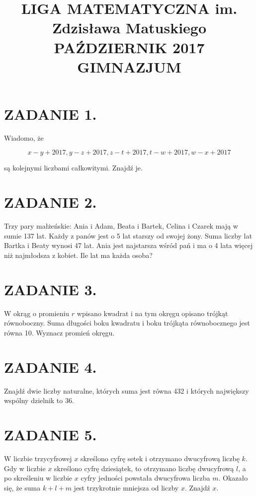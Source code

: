 \documentclass[10pt]{article}
\title{LIGA MATEMATYCZNA im. Zdzisława Matuskiego \\
 PAŹDZIERNIK 2017 \\
 GIMNAZJUM }
\author{}
\date{}
\begin{document}
\maketitle
\section*{ZADANIE 1.}
Wiadomo, że

\[
x-y+2017, y-z+2017, z-t+2017, t-w+2017, w-x+2017
\]

są kolejnymi liczbami całkowitymi. Znajdź je.

\section*{ZADANIE 2.}
Trzy pary małżeńskie: Ania i Adam, Beata i Bartek, Celina i Czarek mają w sumie 137 lat. Każdy z panów jest o 5 lat starszy od swojej żony. Suma liczby lat Bartka i Beaty wynosi 47 lat. Ania jest najstarsza wśród pań i ma o 4 lata więcej niż najmłodsza z kobiet. Ile lat ma każda osoba?

\section*{ZADANIE 3.}
W okrąg o promieniu \(r\) wpisano kwadrat i na tym okręgu opisano trójkąt równoboczny. Suma długości boku kwadratu i boku trójkąta równobocznego jest równa 10. Wyznacz promień okręgu.

\section*{ZADANIE 4.}
Znajdź dwie liczby naturalne, których suma jest równa 432 i których największy wspólny dzielnik to 36.

\section*{ZADANIE 5.}
W liczbie trzycyfrowej \(x\) skreślono cyfrę setek i otrzymano dwucyfrową liczbę \(k\). Gdy w liczbie \(x\) skreślono cyfrę dziesiątek, to otrzymano liczbę dwucyfrową \(l\), a po skreśleniu w liczbie \(x\) cyfry jedności powstała dwucyfrowa liczba \(m\). Okazało się, że suma \(k+l+m\) jest trzykrotnie mniejsza od liczby \(x\). Znajdź \(x\).
\end{document}
